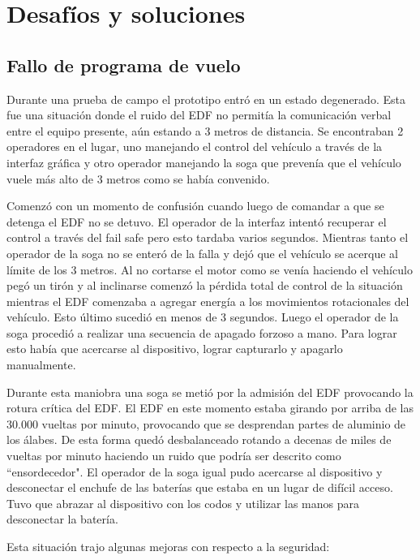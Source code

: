 \section{Desafíos y soluciones}\label{sec:challenges-solutions}

\subsection{Fallo de programa de vuelo}
Durante una prueba de campo el prototipo entró en un estado degenerado. Esta fue una situación donde el ruido del EDF no permitía la comunicación verbal entre el equipo presente, aún estando a 3 metros de distancia. Se encontraban 2 operadores en el lugar, uno manejando el control del vehículo a través de la interfaz gráfica y otro operador manejando la soga que prevenía que el vehículo vuele más alto de 3 metros como se había convenido.

Comenzó con un momento de confusión cuando luego de comandar a que se detenga el EDF no se detuvo. El operador de la interfaz intentó recuperar el control a través del fail safe pero esto tardaba varios segundos. Mientras tanto el operador de la soga no se enteró de la falla y dejó que el vehículo se acerque al límite de los 3 metros. Al no cortarse el motor como se venía haciendo el vehículo pegó un tirón y al inclinarse comenzó la pérdida total de control de la situación mientras el EDF comenzaba a agregar energía a los movimientos rotacionales del vehículo. Esto último sucedió en menos de 3 segundos. Luego el operador de la soga procedió a realizar una secuencia de apagado forzoso a mano. Para lograr esto había que acercarse al dispositivo, lograr capturarlo y apagarlo manualmente.

Durante esta maniobra una soga se metió por la admisión del EDF provocando la rotura crítica del EDF. El EDF en este momento estaba girando por arriba de las 30.000 vueltas por minuto, provocando que se desprendan partes de aluminio de los álabes. De esta forma quedó desbalanceado rotando a decenas de miles de vueltas por minuto haciendo un ruido que podría ser descrito como ``ensordecedor". El operador de la soga igual pudo acercarse al dispositivo y desconectar el enchufe de las baterías que estaba en un lugar de difícil acceso. Tuvo que abrazar al dispositivo con los codos y utilizar las manos para desconectar la batería.

Esta situación trajo algunas mejoras con respecto a la seguridad:

